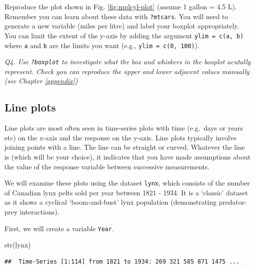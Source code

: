 \documentclass[
  11pt,
  a4paper,
]{book}
\newenvironment{Shaded}{\begin{snugshade}}{\end{snugshade}}
\newcommand{\AttributeTok}[1]{\textcolor[rgb]{0.77,0.63,0.00}{#1}}
\newcommand{\CommentTok}[1]{\textcolor[rgb]{0.56,0.35,0.01}{\textit{#1}}}
\newcommand{\DecValTok}[1]{\textcolor[rgb]{0.00,0.00,0.81}{#1}}
\newcommand{\FunctionTok}[1]{\textcolor[rgb]{0.00,0.00,0.00}{#1}}
\newcommand{\NormalTok}[1]{#1}
\newcommand{\OtherTok}[1]{\textcolor[rgb]{0.56,0.35,0.01}{#1}}
\newcommand{\SpecialCharTok}[1]{\textcolor[rgb]{0.00,0.00,0.00}{#1}}
\begin{document}
Reproduce the plot shown in Fig. \ref{fig:mplcyl-plot} (assume 1 gallon = 4.5 L). Remember you can learn about these data with \texttt{?mtcars}. You will need to generate a new variable (miles per litre) and label your boxplot appropriately. You can limit the extent of the y-axis by adding the argument \texttt{ylim\ =\ c(a,\ b)} where \texttt{a} and \texttt{b} are the limits you want (e.g., \texttt{ylim\ =\ c(0,\ 100)}).

\emph{Q4. Use \texttt{?boxplot} to investigate what the box and whiskers in the boxplot acutally represent. Check you can reproduce the upper and lower adjacent values manually (see Chapter \ref{appendix})}

\hypertarget{line-plots}{%
\subsection{Line plots}\label{line-plots}}

Line plots are most often seen in time-series plots with time (e.g.~days or years etc) on the x-axis and the response on the y-axis. Line plots typically involve joining points with a line. The line can be straight or curved. Whatever the line is (which will be your choice), it indicates that you have made assumptions about the value of the response variable between successive measurements.

We will examine these plots using the dataset \texttt{lynx}, which consists of the number of Canadian lynx pelts sold per year between 1821 - 1934. It is a `classic' dataset as it shows a cyclical `boom-and-bust' lynx population (demonstrating predator-prey interactions).

First, we will create a variable \texttt{Year}.

\begin{Shaded}
\begin{Highlighting}[]
\FunctionTok{str}\NormalTok{(lynx)}
\end{Highlighting}
\end{Shaded}

\begin{verbatim}
##  Time-Series [1:114] from 1821 to 1934: 269 321 585 871 1475 ...
\end{verbatim}

\begin{Shaded}
\end{Shaded}
\end{document}
